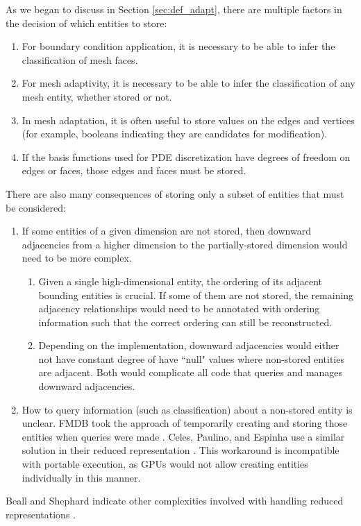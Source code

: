 As we began to discuss in Section \ref{sec:def_adapt},
there are multiple factors in the decision of which entities to store:
\begin{enumerate}
\item For boundary condition application, it is necessary to
be able to infer the classification of mesh faces.
\item For mesh adaptivity, it is necessary to be able to
infer the classification of any mesh entity, whether stored or not.
\item In mesh adaptation, it is often useful to store values
on the edges and vertices (for example, booleans indicating they
are candidates for modification).
\item If the basis functions used for PDE discretization have
degrees of freedom on edges or faces, those edges and faces
must be stored.
\end{enumerate}

There are also many consequences of storing only a subset of entities that
must be considered:
\begin{enumerate}
\item If some entities of a given dimension are not stored, then
downward adjacencies from a higher dimension to the partially-stored dimension
would need to be more complex.
\begin{enumerate}
\item Given a single high-dimensional entity, the ordering of its
adjacent bounding entities is crucial.
If some of them are not stored, the remaining adjacency relationships
would need to be annotated with ordering information such that the correct
ordering can still be reconstructed.
\item Depending on the implementation, downward adjacencies would either
not have constant degree of have ``null" values where non-stored entities
are adjacent.
Both would complicate all code that queries and manages
downward adjacencies.
\end{enumerate}
\item How to query information (such as classification) about a non-stored
entity is unclear. FMDB took the approach of temporarily creating
and storing those entities when queries were made \cite{seol2005fmdb}.
Celes, Paulino, and Espinha use a similar solution in their reduced
representation \cite{celes2005compact}.
This workaround is incompatible with portable execution, as GPUs
would not allow creating entities individually in this manner.
\end{enumerate}
Beall and Shephard indicate other complexities involved
with handling reduced representations \cite{beall1997general}.

